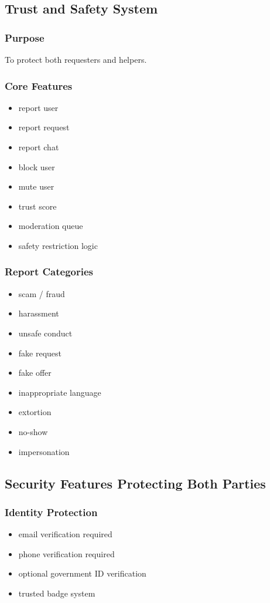 \documentclass[11pt]{article}
\begin{document}
\subsection{Trust and Safety System}

\subsubsection{Purpose}
To protect both requesters and helpers.

\subsubsection{Core Features}
\begin{itemize}[leftmargin=1.5em]
    \item report user
    \item report request
    \item report chat
    \item block user
    \item mute user
    \item trust score
    \item moderation queue
    \item safety restriction logic
\end{itemize}

\subsubsection{Report Categories}
\begin{itemize}[leftmargin=1.5em]
    \item scam / fraud
    \item harassment
    \item unsafe conduct
    \item fake request
    \item fake offer
    \item inappropriate language
    \item extortion
    \item no-show
    \item impersonation
\end{itemize}

\subsection{Security Features Protecting Both Parties}

\subsubsection{Identity Protection}
\begin{itemize}[leftmargin=1.5em]
    \item email verification required
    \item phone verification required
    \item optional government ID verification
    \item trusted badge system
\end{itemize}
\end{document}
